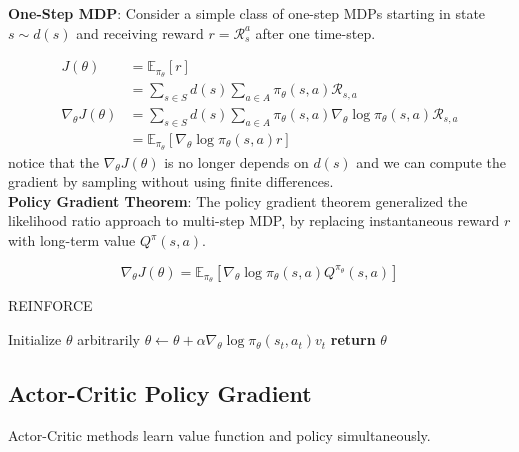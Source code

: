 \noindent \textbf{One-Step MDP}: Consider a simple class of one-step MDPs starting in state $s
    \sim d(s)$ and receiving reward $r = \mathcal{R}_s^a$ after one time-step.

\begin{align*}
    J(\theta)               & = \mathbb{E}_{\pi_\theta}[r]                                                                              \\
                            & = \sum_{s \in S} d(s) \sum_{a \in A} \pi_\theta(s,a) \mathcal{R}_{s,a}                                    \\
    \nabla_\theta J(\theta) & = \sum_{s \in S} d(s) \sum_{a \in A} \pi_\theta(s,a) \nabla_\theta \log \pi_\theta(s,a) \mathcal{R}_{s,a} \\
                            & = \mathbb{E}_{\pi_\theta}[\nabla_\theta \log \pi_\theta(s,a) r]
\end{align*}
notice that the $\nabla_\theta J(\theta)$ is no longer depends on $d(s)$ and we can compute the gradient by sampling without using finite differences.\\

\noindent \textbf{Policy Gradient Theorem}: The policy gradient theorem generalized the likelihood
ratio approach to multi-step MDP, by replacing instantaneous reward $r$ with
long-term value $Q^\pi(s,a)$.

\[
    \nabla_\theta J(\theta) = \mathbb{E}_{\pi_\theta}[\nabla_\theta \log \pi_\theta(s,a) Q^{\pi_\theta}(s,a)]
\]

\begin{algorithm}
    \caption{REINFORCE}
    \begin{algorithmic}
        \State Initialize $\theta$ arbitrarily
        \State $\theta \leftarrow \theta + \alpha \nabla_\theta \log \pi_\theta(s_t, a_t) v_t$
        \EndFor
        \EndFor
        \State \textbf{return} $\theta$
    \end{algorithmic}
\end{algorithm}

\subsection{Actor-Critic Policy Gradient}

Actor-Critic methods learn value function and policy simultaneously.
